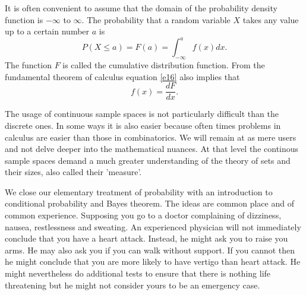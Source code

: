 \documentclass{article}
\begin{document}
It is often convenient to assume that the domain of the probability density 
function is $-\infty$ to $\infty$. The probability that a random variable
$X$ takes any value up to a certain number $a$ is
\begin{equation}\label{e16}
P(X \le a) = F(a) = \int_{-\infty}^a f(x)dx.
\end{equation}
The function $F$ is called the cumulative distribution function. From the
fundamental theorem of calculus equation \eqref{e16} also implies that
\begin{equation}\label{e17}
f(x) = \frac{dF}{dx}.
\end{equation}

The usage of continuous sample spaces is not particularly difficult than
the discrete ones. In some ways it is also easier because often times
problems in calculus are easier than those in combinatorics. We will remain
at as mere users and not delve deeper into the mathematical nuances. At
that level the continous sample spaces demand a much greater understanding
of the theory of sets and their sizes, also called their 'measure'.

We close our elementary treatment of probability with an introduction to
conditional probability and Bayes theorem. The ideas are common place and
of common experience. Supposing you go to a doctor complaining of dizziness,
nausea, restlessness and sweating. An experienced physician will not 
immediately conclude that you have a heart attack. Instead, he might ask 
you to raise you arms. He may also ask you if you can walk without support.
If you cannot then he might conclude that you are more likely to have 
vertigo than heart attack. He might nevertheless do additional tests to
ensure that there is nothing life threatening but he might not consider
yours to be an emergency case. 
\end{document}
